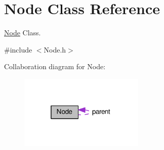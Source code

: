 \hypertarget{class_node}{\section{Node Class Reference}
\label{class_node}
}


\hyperlink{class_node}{Node} Class.  




{\ttfamily \#include $<$Node.\-h$>$}



Collaboration diagram for Node\-:\nopagebreak
\begin{figure}[H]
\begin{center}
\leavevmode
\includegraphics[width=169pt]{class_node__coll__graph}
\end{center}
\end{figure}

